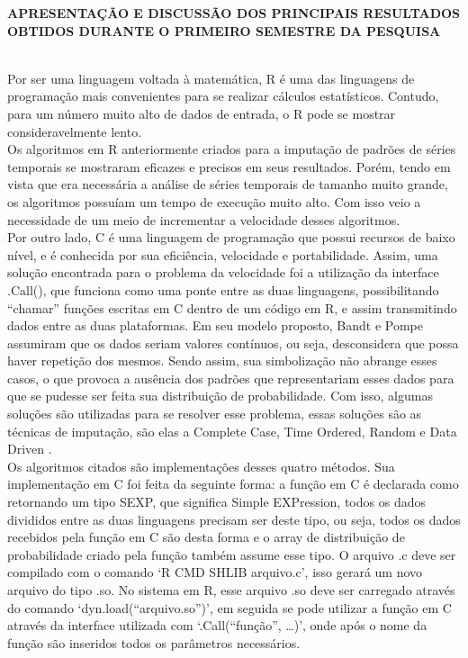\documentclass{article}
\begin{document}
\newpage
\begin{center}
\textbf{\large{APRESENTAÇÃO E DISCUSSÃO DOS PRINCIPAIS RESULTADOS OBTIDOS DURANTE O PRIMEIRO SEMESTRE DA PESQUISA}}\\
\hrulefill \\
\end{center}
    
Por ser uma linguagem voltada à matemática, R é uma das linguagens de programação mais convenientes para se realizar cálculos estatísticos. Contudo, para um número muito alto de dados de entrada, o R pode se mostrar consideravelmente lento.\\
Os algoritmos em R anteriormente criados para a imputação de padrões de séries temporais se mostraram eficazes e precisos em seus resultados. Porém, tendo em vista que era necessária a análise de séries temporais de tamanho muito grande, os algoritmos possuíam um tempo de execução muito alto. Com isso veio a necessidade de um meio de incrementar a velocidade desses algoritmos.\\
Por outro lado, C é uma linguagem de programação que possui recursos de baixo nível, e é conhecida por sua eficiência, velocidade e portabilidade. Assim, uma solução encontrada para o problema da velocidade foi a utilização da interface .Call(), que funciona como uma ponte entre as duas linguagens, possibilitando “chamar” funções escritas em C dentro de um código em R, e assim transmitindo dados entre as duas plataformas.
Em seu modelo proposto, Bandt e Pompe assumiram que os dados seriam valores contínuos, ou seja, desconsidera que possa haver repetição dos mesmos. Sendo assim, sua simbolização não abrange esses casos, o que provoca a ausência dos padrões que representariam esses dados para que se pudesse ser feita sua distribuição de probabilidade. Com isso, algumas soluções são utilizadas para se resolver esse problema, essas soluções são as técnicas de imputação, são elas a Complete Case, Time Ordered, Random e Data Driven \cite{traversaro2018bandt}.\\
Os algoritmos citados são implementações desses quatro métodos. Sua implementação em C foi feita da seguinte forma: a função em C é declarada como retornando um tipo SEXP, que significa Simple EXPression, todos os dados divididos entre as duas linguagens precisam ser deste tipo, ou seja, todos os dados recebidos pela função em C são desta forma e o array de distribuição de probabilidade criado pela função também assume esse tipo. O arquivo .c deve ser compilado com o comando ‘R CMD SHLIB arquivo.c’, isso gerará um novo arquivo do tipo .so. No sistema em R, esse arquivo .so deve ser carregado através do comando ‘dyn.load(“arquivo.so”)’, em seguida se pode utilizar a função em C através da interface utilizada com ‘.Call(“função”, …)’, onde após o nome da função são inseridos todos os parâmetros necessários\cite{.Call}\cite{Extensions}.\\
\end{document}
